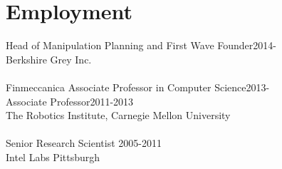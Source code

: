 \section{Employment}
\noindent
Head of Manipulation Planning and First Wave Founder\hfill 2014-\\
Berkshire Grey Inc.\\
\\
Finmeccanica Associate Professor in Computer Science\hfill 2013-\\
Associate Professor\hfill 2011-2013\\
The Robotics Institute, 
Carnegie Mellon University\\
\\
Senior Research Scientist \hfill 2005-2011\\
Intel Labs Pittsburgh\\

